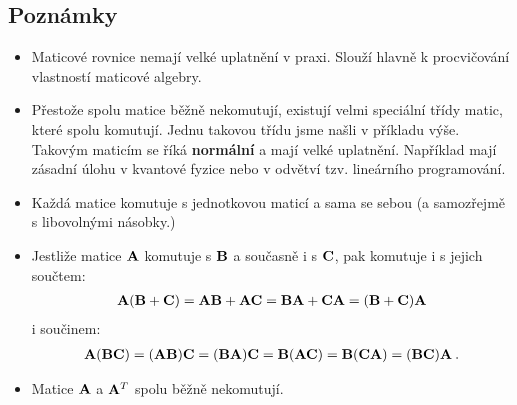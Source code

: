 \subsection*{Poznámky}
\begin{itemize}
    \item Maticové rovnice nemají velké uplatnění v praxi. Slouží hlavně k procvičování vlastností maticové algebry.
    \item Přestože spolu matice běžně nekomutují, existují velmi speciální třídy matic, které spolu komutují. Jednu takovou třídu jsme našli v příkladu výše. Takovým maticím se říká \textbf{normální} a mají velké uplatnění. Například mají zásadní úlohu v kvantové fyzice nebo v odvětví tzv. lineárního programování.
    \item Každá matice komutuje s jednotkovou maticí a sama se sebou (a samozřejmě s libovolnými násobky.)
    \item Jestliže matice $\mathbf{A}$ komutuje s $\mathbf{B}$ a současně i s $\mathbf{C}$, pak komutuje i s jejich součtem:
    \begin{align}
        \mathbf{A} (\mathbf{B} + \mathbf{C}) = \mathbf{A} \mathbf{B} + \mathbf{A} \mathbf{C} = \mathbf{B} \mathbf{A} + \mathbf{C} \mathbf{A} = (\mathbf{B} + \mathbf{C}) \mathbf{A}
    \end{align}
    i součinem:
    \begin{align}
        \mathbf{A} (\mathbf{B} \mathbf{C}) = (\mathbf{A} \mathbf{B}) \mathbf{C} = (\mathbf{B} \mathbf{A}) \mathbf{C} = \mathbf{B} (\mathbf{A} \mathbf{C}) = \mathbf{B} (\mathbf{C} \mathbf{A}) = (\mathbf{B} \mathbf{C}) \mathbf{A} \:. 
    \end{align}
    \item Matice $\mathbf{A}$ a $\mathbf{A}^T$ spolu běžně nekomutují.
\end{itemize}